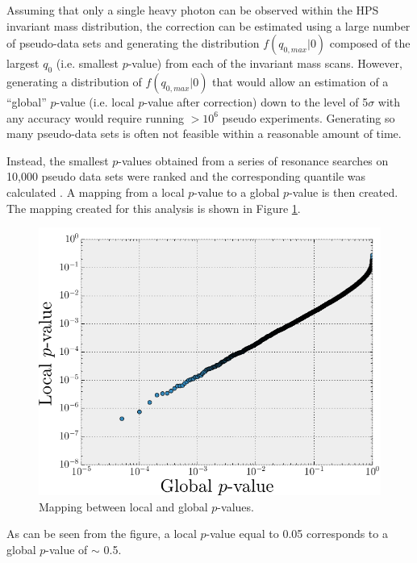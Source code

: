 Assuming that only a single heavy photon can be observed within the HPS invariant
mass distribution, the correction can be estimated using a large number
of pseudo-data sets and generating the distribution 
$f(q_{0, max} | 0)$ composed of the largest $q_{0}$ (i.e. smallest $p$-value)
from each of the invariant mass scans.
However, generating a distribution of $f(q_{0, max} | 0)$ that would allow 
an estimation of a ``global''  
$p$-value (i.e. local $p$-value after correction) down to the level of 5$\sigma$ with any accuracy would 
require running $> 10^{6}$ pseudo experiments.  Generating so many pseudo-data 
sets is often not feasible within a reasonable amount of time. 

Instead, the smallest
$p$-values obtained from a series of resonance searches on 10,000 pseudo
data sets were
ranked and the corresponding quantile was calculated \cite{Gross:2010qma}.  
A mapping from a local 
$p$-value to a global $p$-value is then created.  The mapping created 
for this analysis is shown in Figure \ref{fig:global_p_value}.
\begin{figure}[t]
    \centering
    \includegraphics[width=\textwidth]{images/global_p_value_map.png}
    \caption{Mapping between local and global $p$-values.}
    \label{fig:global_p_value}
\end{figure}
As can be seen from the figure, a 
local $p$-value equal to 0.05 corresponds to a global $p$-value of $\sim$ 0.5.

